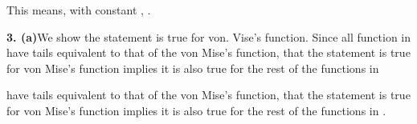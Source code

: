 \documentclass{article}
\begin{document}
\begin{Maple Normal}
{\begin{Maple Normal}
{Typesetting:-mrow(Typesetting:-mi("&alpha;", italic = "false", mathvariant = "normal")), superscriptshift = "0")), superscriptshift = "0"))}{\[\displaystyle P \left(\frac{{\it `M__n` }-{\it `x__F` }}{{\it `x__F` }-F ^{\eslarr }\left(1-\frac{1}{n }\right)}<x \right)\essrarr e ^{-\left(-x \right)^{\alpha }}\]}
}\end{Maple Normal}
}\end{Maple Normal}
\begin{Maple Normal}{
\begin{Maple Normal}{
This means, with constant
,
.}\end{Maple Normal}

}\end{Maple Normal}

\begin{Maple Normal}{
\begin{Maple Normal}{
}\end{Maple Normal}
}\end{Maple Normal}
\begin{Maple Normal}{
\begin{Maple Normal}{
\textbf{3. (a)}We show the statement is true for von. Vise's function. Since all function in
have tails equivalent to that of the von Mise's function, that the statement is true for von Mise's function implies it is also true for the rest of the functions in}\end{Maple Normal}

\begin{Maple Normal}{
have tails equivalent to that of the von Mise's function, that the statement is true for von Mise's function implies it is also true for the rest of the functions in
.}\end{Maple Normal}

}\end{Maple Normal}
\end{document}
